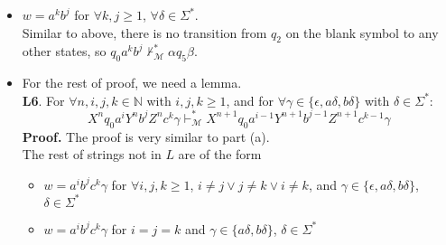\documentclass[12pt]{article}
\begin{document}
\begin{itemize}
  \item \(w = a^kb^j\) for \(\forall k, j \geq 1\), \(\forall \delta \in \Sigma^*\).\\
  Similar to above, there is no transition from \(q_2\) on the blank symbol to any other states, so \(q_0a^kb^j \nvdash^*_\mathcal{M} \alpha q_5 \beta\).
  \item For the rest of proof, we need a lemma.\\
  \textbf{L6}. For \(\forall n, i, j, k \in \mathbb{N}\) with \(i, j, k \geq 1\), and for \(\forall \gamma \in \{\epsilon, a\delta, b\delta\}\) with \(\delta \in \Sigma^*\):
  \begin{equation*}
    X^nq_0a^iY^nb^jZ^nc^k\gamma \vdash^*_\mathcal{M} X^{n+1}q_0a^{i-1}Y^{n+1}b^{j-1}Z^{n+1}c^{k-1}\gamma
  \end{equation*}
  \textbf{Proof.} The proof is very similar to part (a).\\
  The rest of strings not in \(L\) are of the form 
  \begin{itemize}
    \item \(w = a^ib^jc^k\gamma\) for \(\forall i,j,k \geq 1\), \(i \neq j \lor  j \neq k \lor i \neq k\), and \(\gamma \in \{\epsilon, a\delta, b\delta\}\), \(\delta \in \Sigma^*\)
    \item \(w = a^ib^jc^k\gamma\) for \(i = j = k\) and \(\gamma \in \{a\delta, b\delta\}\), \(\delta \in \Sigma^*\)
  \end{itemize}

\end{itemize}
\end{document}
